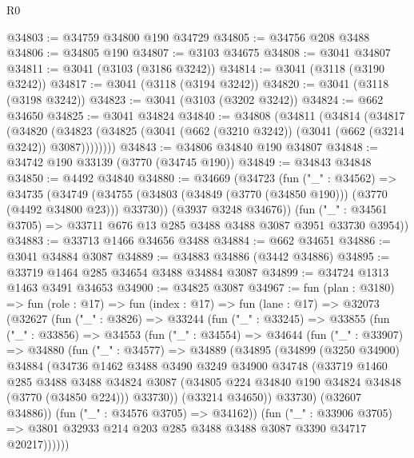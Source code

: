 \begin{lexlean}{R0}
\begin{coremodule}
@34803 := @34759 @34800 @190 @34729
@34805 := @34756 @208 @3488
@34806 := @34805 @190
@34807 := @3103 @34675
@34808 := @3041 @34807
@34811 := @3041 (@3103 (@3186 @3242))
@34814 := @3041 (@3118 (@3190 @3242))
@34817 := @3041 (@3118 (@3194 @3242))
@34820 := @3041 (@3118 (@3198 @3242))
@34823 := @3041 (@3103 (@3202 @3242))
@34824 := @662 @34650
@34825 := @3041 @34824
@34840 := @34808
    (@34811
      (@34814
        (@34817
          (@34820
            (@34823 (@34825 (@3041 (@662 (@3210 @3242)) (@3041 (@662 (@3214 @3242)) @3087))))))))
@34843 := @34806 @34840 @190 @34807
@34848 := @34742 @190 @33139 (@3770 (@34745 @190))
@34849 := @34843 @34848
@34850 := @4492 @34840
@34880 := @34669
    (@34723
      (fun ("_" : @34562) =>
      @34735
        (@34749 (@34755 (@34803 (@34849 (@3770 (@34850 @190))) (@3770 (@4492 @34800 @23))) @33730))
        (@3937 @3248 @34676))
      (fun ("_" : @34561 @3705) => @33711 @676 @13 @285 @3488 @3488 @3087 @3951 @33730 @3954))
@34883 := @33713 @1466 @34656 @3488
@34884 := @662 @34651
@34886 := @3041 @34884 @3087
@34889 := @34883 @34886 (@3442 @34886)
@34895 := @33719 @1464 @285 @34654 @3488 @34884 @3087
@34899 := @34724 @1313 @1463 @3491 @34653
@34900 := @34825 @3087
@34967 := fun (plan : @3180) =>
  fun (role : @17) =>
  fun (index : @17) =>
  fun (lane : @17) =>
  @32073
    (@32627
      (fun ("_" : @3826) =>
      @33244
        (fun ("_" : @33245) =>
        @33855
          (fun ("_" : @33856) =>
          @34553
            (fun ("_" : @34554) =>
            @34644
              (fun ("_" : @33907) =>
              @34880
                (fun ("_" : @34577) =>
                @34889
                  (@34895
                    (@34899
                      (@3250 @34900)
                      @34884
                      (@34736
                        @1462
                        @3488
                        @3490
                        @3249
                        @34900
                        @34748
                        (@33719
                          @1460
                          @285
                          @3488
                          @3488
                          @34824
                          @3087
                          (@34805 @224 @34840 @190 @34824 @34848 (@3770 (@34850 @224)))
                          @33730))
                      (@33214 @34650))
                    @33730)
                  (@32607 @34886))
                (fun ("_" : @34576 @3705) => @34162))
              (fun ("_" : @33906 @3705) =>
              @3801 @32933 @214 @203 @285 @3488 @3488 @3087 @3390 @34717 @20217))))))

\end{coremodule}
\end{lexlean}

